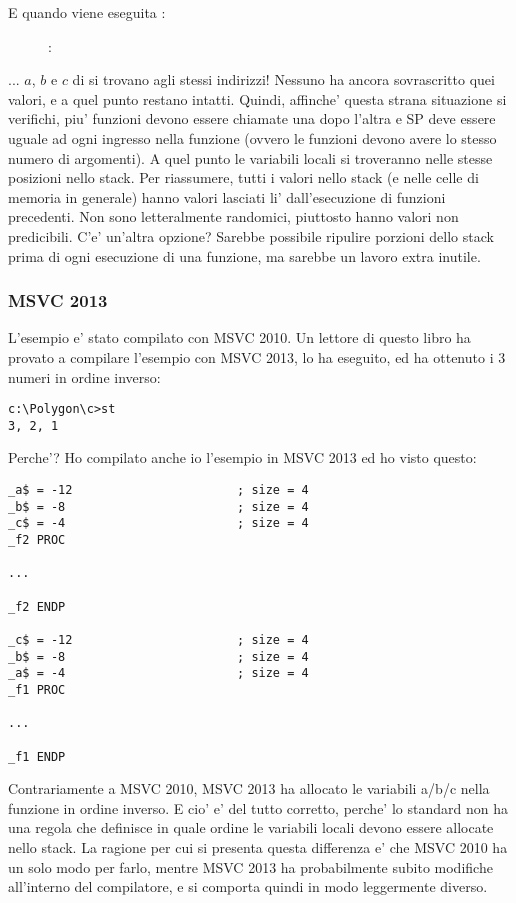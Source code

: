 \clearpage
E quando viene eseguita :

\begin{figure}[H]
\centering
{}
\caption{\olly: }
\label{fig:stack_noise_olly2}
\end{figure}

... $a$, $b$ e $c$ di  si trovano agli stessi indirizzi!
Nessuno ha ancora sovrascritto quei valori, e a quel punto restano intatti.
Quindi, affinche' questa strana situazione si verifichi, piu' funzioni devono essere chiamate una dopo l'altra e
\ac{SP} deve essere uguale ad ogni ingresso nella funzione (ovvero le funzioni devono avere lo stesso numero di argomenti).
A quel punto le variabili locali si troveranno nelle stesse posizioni nello stack.
Per riassumere, tutti i valori nello stack (e nelle celle di memoria in generale) hanno valori lasciati li' dall'esecuzione di funzioni precedenti.
Non sono letteralmente randomici, piuttosto hanno valori non predicibili.
C'e' un'altra opzione?
Sarebbe possibile ripulire porzioni dello stack prima di ogni esecuzione di una funzione, ma sarebbe un lavoro extra inutile.

\subsubsection{MSVC 2013}

L'esempio e' stato compilato con MSVC 2010.
Un lettore di questo libro ha provato a compilare l'esempio con MSVC 2013, lo ha eseguito, ed ha ottenuto i 3 numeri in ordine inverso:%

\begin{lstlisting}
c:\Polygon\c>st
3, 2, 1
\end{lstlisting}

Perche'?
Ho compilato anche io l'esempio in MSVC 2013 ed ho visto questo:


\begin{lstlisting}[caption=MSVC 2013]
_a$ = -12						; size = 4
_b$ = -8						; size = 4
_c$ = -4						; size = 4
_f2	PROC

...

_f2	ENDP

_c$ = -12						; size = 4
_b$ = -8						; size = 4
_a$ = -4						; size = 4
_f1	PROC

...

_f1	ENDP
\end{lstlisting}

Contrariamente a MSVC 2010, MSVC 2013 ha allocato le variabili a/b/c nella funzione  in ordine inverso.%
E cio' e' del tutto corretto, perche' lo standard \CCpp non ha una regola che definisce in quale ordine le variabili locali devono essere allocate nello stack.
La ragione per cui si presenta questa differenza e' che MSVC 2010 ha un solo modo per farlo, mentre MSVC 2013 ha probabilmente subito modifiche all'interno del compilatore, e si comporta quindi in modo leggermente diverso. 
